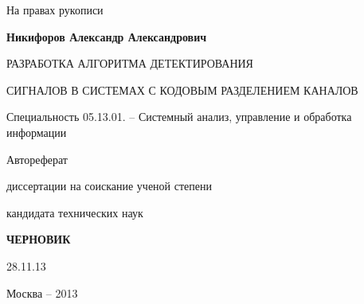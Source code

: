 \hfill На правах рукописи

\vspace{\baselineskip}
\vspace{\baselineskip}
\vspace{\baselineskip}
\vspace{\baselineskip}

\noindent\centerline{\bf{Никифоров Александр Александрович}}

\vspace{\baselineskip}
\vspace{\baselineskip}
\vspace{\baselineskip}
\vspace{\baselineskip}

\noindent\centerline{РАЗРАБОТКА АЛГОРИТМА ДЕТЕКТИРОВАНИЯ}
\noindent\centerline{СИГНАЛОВ В СИСТЕМАХ С КОДОВЫМ РАЗДЕЛЕНИЕМ КАНАЛОВ}

\vspace{\baselineskip}
\vspace{\baselineskip}
\vspace{\baselineskip}
\vspace{\baselineskip}

\noindent\centerline{Специальность 05.13.01. – Системный анализ, управление и обработка информации}

\vspace{\baselineskip}
\vspace{\baselineskip}
\vspace{\baselineskip}
\vspace{\baselineskip}

\noindent\centerline{Автореферат} 
\noindent\centerline{диссертации на соискание ученой степени}
\noindent\centerline{кандидата технических наук}


\vspace{\baselineskip}
\vspace{\baselineskip}
\vspace{\baselineskip}
\vspace{\baselineskip}
\noindent\centerline{\bf{ЧЕРНОВИК}}
\noindent\centerline{28.11.13}

\vfill
\noindent\centerline{Москва – 2013}

\newpage

\vspace{\baselineskip}
\vspace{\baselineskip}
\vspace{\baselineskip}
\vspace{\baselineskip}

